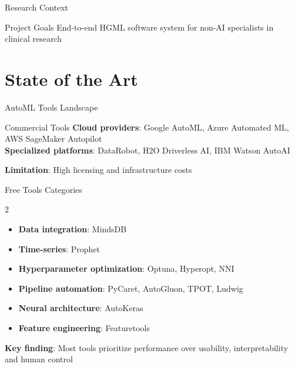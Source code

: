 \documentclass[aspectratio=169,10pt,english,dvipsnames]{beamer}
\begin{document}
\begin{frame}{Research Context}
\begin{minipage}{0.45\textwidth}
        \vspace{5mm}
        
        \begin{block}{Project Goals}
            End-to-end HGML software system for non-AI specialists in clinical research
        \end{block}
    \end{minipage}
\end{frame}


\section{State of the Art}

\begin{frame}{AutoML Tools Landscape}
    \begin{block}{Commercial Tools}
        \textbf{Cloud providers}: Google AutoML, Azure Automated ML, AWS SageMaker Autopilot\\
        \textbf{Specialized platforms}: DataRobot, H2O Driverless AI, IBM Watson AutoAI
        
        \textbf{Limitation}: High licensing and infrastructure costs
    \end{block}
    
    \begin{block}{Free Tools Categories}
        \begin{multicols}{2}
            \begin{itemize}
                \item \textbf{Data integration}: MindsDB
                \item \textbf{Time-series}: Prophet
                \item \textbf{Hyperparameter optimization}: Optuna, Hyperopt, NNI
                \item \textbf{Pipeline automation}: PyCaret, AutoGluon, TPOT, Ludwig
                \item \textbf{Neural architecture}: AutoKeras
                \item \textbf{Feature engineering}: Featuretools
            \end{itemize}
        \end{multicols}
    \end{block}
    
    \textbf{Key finding}: Most tools prioritize performance over usability, interpretability and human control
\end{frame}
\end{document}
